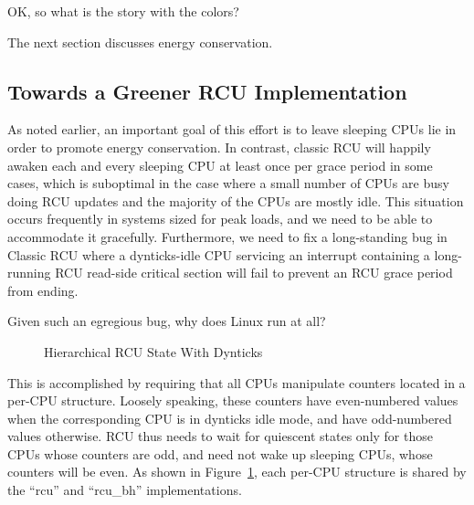 \QuickQuiz{}
	OK, so what is the story with the colors?
 \QuickQuizEnd

The next section discusses energy conservation.

\subsection{Towards a Greener RCU Implementation}
\label{app:rcuimpl:rcutree:Towards a Greener RCU Implementation}

As noted earlier, an important goal of this effort is to leave sleeping
CPUs lie in order to promote energy conservation.
In contrast, classic RCU will happily awaken each and every sleeping CPU
at least once per grace period in some cases,
which is suboptimal in the case where
a small number of CPUs are busy doing RCU updates and the majority of
the CPUs are mostly idle.
This situation occurs frequently in systems sized for peak loads, and
we need to be able to accommodate it gracefully.
Furthermore, we need to fix a long-standing bug in Classic RCU where
a dynticks-idle CPU servicing an interrupt containing a long-running
RCU read-side critical section will fail to prevent an RCU grace period
from ending.

\QuickQuiz{}
	Given such an egregious bug, why does Linux run at all?
 \QuickQuizEnd

\begin{figure}[htb]
\centering
{}
\caption{Hierarchical RCU State With Dynticks}
\label{fig:app:rcuimpl:rcutree:Hierarchical RCU State With Dynticks}
\end{figure}

This is accomplished by requiring that all CPUs manipulate counters
located in a per-CPU  structure.
Loosely speaking, these counters have even-numbered values when the
corresponding CPU is in dynticks idle mode, and have odd-numbered values
otherwise.
RCU thus needs to wait for quiescent states only for those CPUs whose
 counters are odd, and need not wake up sleeping
CPUs, whose counters will be even.
As shown in
Figure~\ref{fig:app:rcuimpl:rcutree:Hierarchical RCU State With Dynticks},
each per-CPU  structure
is shared by the ``rcu'' and ``rcu\_bh'' implementations.

